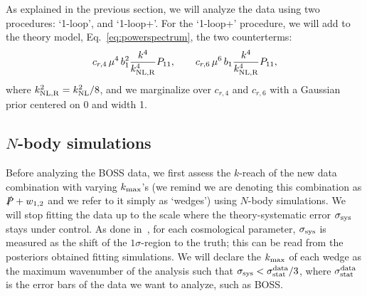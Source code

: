 \documentclass[12pt,a4paper]{article}
\def\PA{\slashed{P}}
\renewcommand{\(}{\left(}
\renewcommand{\)}{\right)}
\begin{document}
As explained in {the} previous section, we will analyze the data using two procedures: `1-loop', and `1-loop+'. 
For the `1-loop+' procedure, we will add to the theory model, Eq.~\eqref{eq:powerspectrum}, the two counterterms:
\begin{equation}
c_{r,4} \, \mu^4 \, b_1^2 \frac{k^4}{k_{\rm NL,R}^4} P_{11}, \qquad
c_{r,6} \, \mu^6 \, b_1 \frac{k^4}{k_{\rm NL,R}^4} P_{11},
\end{equation}
where $k_{\rm NL,R}^2 = k_{\rm NL}^2/8$, and we marginalize over $c_{r,4}$ and $c_{r,6}$ with a Gaussian prior centered on 0 and width 1. 

\subsection{$N$-body simulations}

Before analyzing the BOSS data, we first assess the $k$-reach of the new data combination with varying $k_{\rm max}$'s (we remind we are denoting this combination as $\PA + w_{1,2}$ and we refer to it simply as `wedges') using $N$-body simulations. 
We will stop fitting the data up to the scale where the theory-systematic error $\sigma_{\rm sys}$ stays under control. 
As done in~\cite{DAmico:2019fhj}, for each cosmological parameter, $\sigma_{\rm sys}$ is measured as the shift of the $1\sigma$-region to the truth; this can be read from the posteriors obtained fitting simulations. 
We will declare the $k_{\rm max}$ of each wedge as the maximum wavenumber of the analysis such that $\sigma_{\rm sys} < \sigma_{\rm stat}^{\rm data}/3$, where $\sigma_{\rm stat}^{\rm data}$ is the error bars of the data we want to analyze, such as BOSS. 
\end{document}
